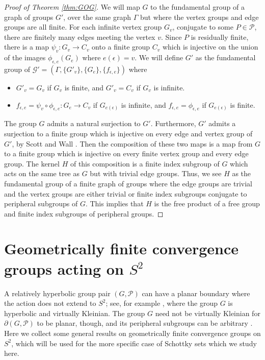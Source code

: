 \documentclass[11pt]{article}
\theoremstyle{definition}
\newcommand\PP{\mathcal{P}}
\begin{document}
   
\begin{proof}[Proof of Theorem \ref{thm:GOG}]
We will map $G$ to the fundamental group of a graph of groups $G'$, over the same graph $\Gamma$ but where the vertex groups and edge groups are all finite. 
For each infinite vertex group $G_v$, conjugate to some $P \in \mathcal{P}$, there are finitely many edges meeting the vertex $v$.  Since $P$ is residually finite, there is a map
 $\psi_v:G_v  \rightarrow C_v$ onto a finite group $C_v$
 which is injective on the union of the images  $\phi_{\epsilon, e}(G_e)$ where $e(\epsilon) =v$.  
We will define $G'$ as the fundamental group of $\mathcal{G'} = (\Gamma, \lbrace G'_v \rbrace, \lbrace G_e \rbrace, \lbrace f_{\epsilon, e} \rbrace)$ where \begin{itemize} 

\item $G'_v = G_v$ if $G_v$ is finite, and $G'_v = C_v$  if $G_v$ is infinite. 
\item $f_{\epsilon, e} = \psi_v\circ \phi_{\epsilon,e} : G_e \rightarrow C_v$ if $G_{e(\epsilon)} $ is infinite, and $f_{\epsilon, e} = \phi_{\epsilon,e}$ if $G_{e(\epsilon)}$ is finite. 
\end{itemize} 

The group $G$ admits a natural surjection to $G'$.  Furthermore, $G'$ admits a surjection to a finite group which is injective on every edge and vertex group of $G'$, by Scott and Wall \cite[Chapter 7]{scott:wall}.  
Then the composition of these two maps is a map from $G$ to a finite group which is injective on every finite vertex group and every edge group.  The kernel $H$ of this composition is a finite index subgroup
of $G$ which acts on the  same tree as $G$ but with trivial edge groups. Thus, we see $H$ as the fundamental group of a finite graph of groups where the edge groups are trivial and the vertex groups
are either trivial or finite index subgroups conjugate to peripheral subgroups of $G$. This implies that $H$ is the free product of a free group and finite index subgroups of peripheral groups. 
\end{proof} 




\section{Geometrically finite convergence groups acting on $S^2$}
\label{sec:S2}

A relatively hyperbolic group pair $(G,\PP)$ can have a planar boundary where the action does not extend to $S^2$;  see, for example \cite[Section 9]{KK}, where the group $G$ is hyperbolic and virtually Kleinian. The group $G$ need not be virtually Kleinian for $\partial(G, \PP)$ to be planar, though, and its peripheral subgroups can be arbitrary \cite{hruska:walsh}.
Here we collect some general results on geometrically finite convergence groups on $S^2$, which will be used for the more specific case of Schottky sets which we study here. 
\end{document}
